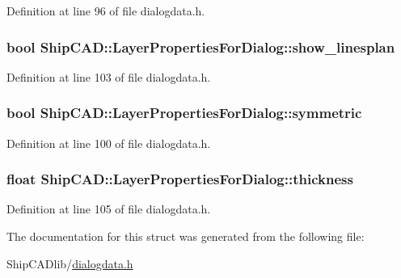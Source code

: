 Definition at line 96 of file dialogdata.\+h.

\subsubsection[{\texorpdfstring{show\+\_\+linesplan}{show_linesplan}}]{\setlength{\rightskip}{0pt plus 5cm}bool Ship\+C\+A\+D\+::\+Layer\+Properties\+For\+Dialog\+::show\+\_\+linesplan}\hypertarget{structShipCAD_1_1LayerPropertiesForDialog_a7df2aaba3b7824534100f46546d9479e}{}\label{structShipCAD_1_1LayerPropertiesForDialog_a7df2aaba3b7824534100f46546d9479e}


Definition at line 103 of file dialogdata.\+h.

\subsubsection[{\texorpdfstring{symmetric}{symmetric}}]{\setlength{\rightskip}{0pt plus 5cm}bool Ship\+C\+A\+D\+::\+Layer\+Properties\+For\+Dialog\+::symmetric}\hypertarget{structShipCAD_1_1LayerPropertiesForDialog_a3acf39b44721d89ea8906052cc0bedde}{}\label{structShipCAD_1_1LayerPropertiesForDialog_a3acf39b44721d89ea8906052cc0bedde}


Definition at line 100 of file dialogdata.\+h.

\subsubsection[{\texorpdfstring{thickness}{thickness}}]{\setlength{\rightskip}{0pt plus 5cm}float Ship\+C\+A\+D\+::\+Layer\+Properties\+For\+Dialog\+::thickness}\hypertarget{structShipCAD_1_1LayerPropertiesForDialog_aeeae5cf44e195fe6f70d4f09a4fa3fef}{}\label{structShipCAD_1_1LayerPropertiesForDialog_aeeae5cf44e195fe6f70d4f09a4fa3fef}


Definition at line 105 of file dialogdata.\+h.



The documentation for this struct was generated from the following file\+:\begin{DoxyCompactItemize}
\item 
Ship\+C\+A\+Dlib/\hyperlink{dialogdata_8h}{dialogdata.\+h}\end{DoxyCompactItemize}
